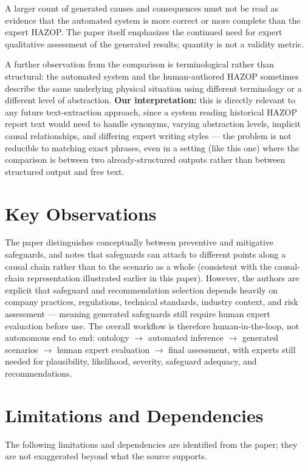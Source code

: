 \begin{constraint}
A larger count of generated causes and consequences must not be read as
evidence that the automated system is more correct or more complete than
the expert HAZOP. The paper itself emphasizes the continued need for
expert qualitative assessment of the generated results; quantity is not a
validity metric.
\end{constraint}

A further observation from the comparison is terminological rather than structural: the automated system and the human-authored HAZOP sometimes describe the same underlying physical situation using different terminology or a different level of abstraction. \textbf{Our interpretation:} this is directly relevant to any future text-extraction approach, since a system reading historical HAZOP report text would need to handle synonyms, varying abstraction levels, implicit causal relationships, and differing expert writing styles --- the problem is not reducible to matching exact phrases, even in a setting (like this one) where the comparison is between two already-structured outputs rather than between structured output and free text.

\section{Key Observations}
The paper distinguishes conceptually between preventive and mitigative safeguards, and notes that safeguards can attach to different points along a causal chain rather than to the scenario as a whole (consistent with the causal-chain representation illustrated earlier in this paper). However, the authors are explicit that safeguard and recommendation selection depends heavily on company practices, regulations, technical standards, industry context, and risk assessment --- meaning generated safeguards still require human expert evaluation before use. The overall workflow is therefore human-in-the-loop, not autonomous end to end: ontology $\rightarrow$ automated inference $\rightarrow$ generated scenarios $\rightarrow$ human expert evaluation $\rightarrow$ final assessment, with experts still needed for plausibility, likelihood, severity, safeguard adequacy, and recommendations.

\section{Limitations and Dependencies}
The following limitations and dependencies are identified from the paper; they are not exaggerated beyond what the source supports.

